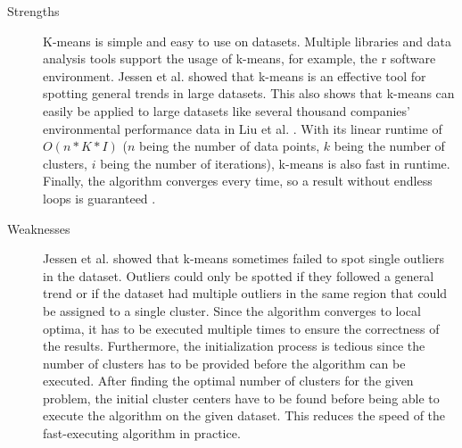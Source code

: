 \begin{description}
    \item[Strengths]
    K-means is simple and easy to use on datasets.
    Multiple libraries and data analysis tools support the usage of k-means, for example, the r software environment.
    Jessen et al. \cite{JES-IND} showed that k-means is an effective tool for spotting general trends in large datasets.
    This also shows that k-means can easily be applied to large datasets like several thousand companies' environmental performance data in Liu et al. \cite{LIU-BDE}.
    With its linear runtime of $O(n * K * I)$ ($n$ being the number of data points, $k$ being the number of clusters, $i$ being the number of iterations), k-means is also fast in runtime.
    Finally, the algorithm converges every time, so a result without endless loops is guaranteed \cite{SEL-GCT}.
    \item[Weaknesses]
    Jessen et al. \cite{JES-IND} showed that k-means sometimes failed to spot single outliers in the dataset.
    Outliers could only be spotted if they followed a general trend or if the dataset had multiple outliers in the same region that could be assigned to a single cluster.
    Since the algorithm converges to local optima, it has to be executed multiple times to ensure the correctness of the results.
    Furthermore, the initialization process is tedious since the number of clusters has to be provided before the algorithm can be executed.
    After finding the optimal number of clusters for the given problem, the initial cluster centers have to be found before being able to execute the algorithm on the given dataset.
    This reduces the speed of the fast-executing algorithm in practice.
    \end{description}
    
